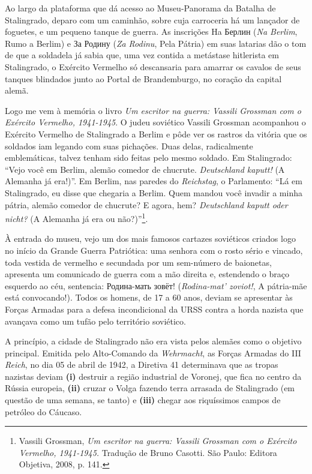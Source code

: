 Ao largo da plataforma que dá acesso ao Museu-Panorama da Batalha de
Stalingrado, deparo com um caminhão, sobre cuja carroceria há um
lançador de foguetes, e um pequeno tanque de guerra. As inscrições Ha
Берлин (\emph{Na Berlim}, Rumo a Berlim) e За Родину (\emph{Za Rodinu},
Pela Pátria) em suas latarias dão o tom de que a soldadela já sabia que,
uma vez contida a metástase hitlerista em Stalingrado, o Exército
Vermelho só descansaria para amarrar os cavalos de seus tanques
blindados junto ao Portal de Brandemburgo, no coração da capital alemã.

Logo me vem à memória o livro \emph{Um escritor na guerra: Vassili
Grossman com o Exército Vermelho, 1941-1945}. O judeu soviético Vassili
Grossman acompanhou o Exército Vermelho de Stalingrado a Berlim e pôde
ver os rastros da vitória que os soldados iam legando com suas
pichações. Duas delas, radicalmente emblemáticas, talvez tenham sido
feitas pelo mesmo soldado. Em Stalingrado: ``Vejo você em Berlim, alemão
comedor de chucrute. \emph{Deutschland kaputt!} (A Alemanha já era!)''.
Em Berlim, nas paredes do \emph{Reichstag}, o Parlamento: ``Lá em
Stalingrado, eu disse que chegaria a Berlim. Quem mandou você invadir a
minha pátria, alemão comedor de chucrute? E agora, hem?
\emph{Deutschland kaputt oder nicht?} (A Alemanha já era ou
não?)''\footnote{Vassili Grossman, \emph{Um escritor na guerra: Vassili
  Grossman com o Exército Vermelho, 1941-1945.} Tradução de Bruno
  Casotti. São Paulo: Editora Objetiva, 2008, p. 141.}.

À entrada do museu, vejo um dos mais famosos cartazes soviéticos criados
logo no início da Grande Guerra Patriótica: uma senhora com o rosto
sério e vincado, toda vestida de vermelho e secundada por um sem-número
de baionetas, apresenta um comunicado de guerra com a mão direita e,
estendendo o braço esquerdo ao céu, sentencia: Родина-мать зовёт!
(\emph{Rodina-mat' zoviot!}, A pátria-mãe está convocando!). Todos os
homens, de 17 a 60 anos, deviam se apresentar às Forças Armadas para a
defesa incondicional da URSS contra a horda nazista que avançava como um
tufão pelo território soviético.

A princípio, a cidade de Stalingrado não era vista pelos alemães como o
objetivo principal. Emitida pelo Alto-Comando da \emph{Wehrmacht}, as
Forças Armadas do III \emph{Reich}, no dia 05 de abril de 1942, a
Diretiva 41 determinava que as tropas nazistas deviam \textbf{(i)}
destruir a região industrial de Voronej, que fica no centro da Rússia
europeia, \textbf{(ii)} cruzar o Volga fazendo terra arrasada de
Stalingrado (em questão de uma semana, se tanto) e \textbf{(iii)} chegar
aos riquíssimos campos de petróleo do Cáucaso.

